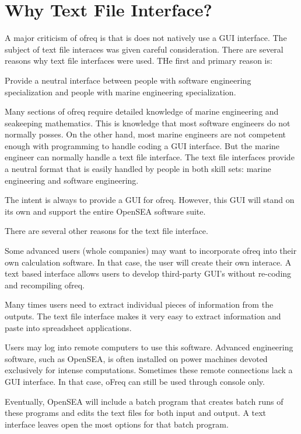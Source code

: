 \section*{Why Text File Interface?}

A major criticism of ofreq is that is does not natively use a G\-U\-I interface. The subject of text file interaces was given careful consideration. There are several reasons why text file interfaces were used. T\-He first and primary reason is\-:


\begin{DoxyItemize}
\item Provide a neutral interface between people with software engineering specialization and people with marine engineering specialization.
\end{DoxyItemize}

Many sections of ofreq require detailed knowledge of marine engineering and seakeeping mathematics. This is knowledge that most software engineers do not normally posses. On the other hand, most marine engineers are not competent enough with programming to handle coding a G\-U\-I interface. But the marine engineer can normally handle a text file interface. The text file interfaces provide a neutral format that is easily handled by people in both skill sets\-: marine engineering and software engineering.

The intent is always to provide a G\-U\-I for ofreq. However, this G\-U\-I will stand on its own and support the entire Open\-S\-E\-A software suite.

There are several other reasons for the text file interface.


\begin{DoxyEnumerate}
\item Some advanced users (whole companies) may want to incorporate ofreq into their own calculation software. In that case, the user will create their own interace. A text based interface allows users to develop third-\/party G\-U\-I's without re-\/coding and recompiling ofreq.
\item Many times users need to extract individual pieces of information from the outputs. The text file interface makes it very easy to extract information and paste into spreadsheet applications.
\item Users may log into remote computers to use this software. Advanced engineering software, such as Open\-S\-E\-A, is often installed on power machines devoted exclusively for intense computations. Sometimes these remote connections lack a G\-U\-I interface. In that case, o\-Freq can still be used through console only.
\item Eventually, Open\-S\-E\-A will include a batch program that creates batch runs of these programs and edits the text files for both input and output. A text interface leaves open the most options for that batch program.
\end{DoxyEnumerate}

